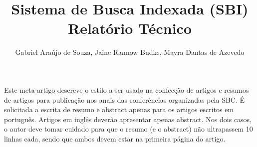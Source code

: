 \documentclass[12pt]{article}
\title{Sistema de Busca Indexada (SBI)\\ Relatório Técnico}
\author{Gabriel Araújo de Souza\inst{1}, Jaine Rannow Budke\inst{2}, Mayra Dantas de Azevedo\inst{3} }
\begin{document}
 

\maketitle

     
\begin{resumo} 
  Este meta-artigo descreve o estilo a ser usado na confecção de artigos e
  resumos de artigos para publicação nos anais das conferências organizadas
  pela SBC. É solicitada a escrita de resumo e abstract apenas para os artigos
  escritos em português. Artigos em inglês deverão apresentar apenas abstract.
  Nos dois casos, o autor deve tomar cuidado para que o resumo (e o abstract)
  não ultrapassem 10 linhas cada, sendo que ambos devem estar na primeira
  página do artigo.
\end{resumo}
\end{document}
